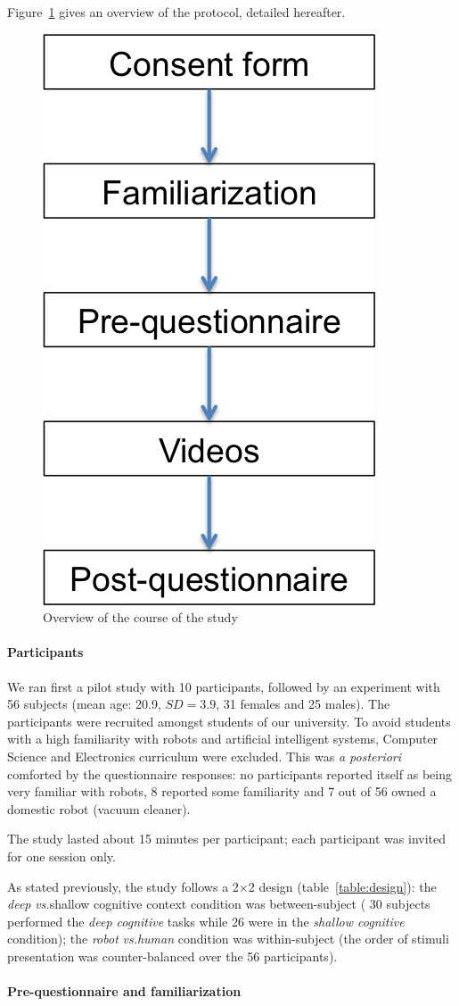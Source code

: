 \documentclass[lettersize, noapacite, twoside, HRI]{apa_HRI}
\newcommand{\vs}{\textit{vs.}\xspace}
\begin{document}
Figure~\ref{course_of_study} gives an overview of the protocol, detailed
hereafter.

\begin{figure}[ht!]
    \centering
    \includegraphics[width=0.3\linewidth]{experimentFlow}
    \caption{Overview of the course of the study}
    \label{course_of_study}
\end{figure}
\paragraph{Participants}

We ran first a pilot study with 10 participants, followed by an experiment with
56 subjects (mean age: 20.9, $SD=3.9$, 31 females and 25 males).
The participants were recruited amongst students of our university. To avoid
students with a high familiarity with robots and artificial intelligent systems,
Computer Science and Electronics curriculum were excluded. This was \textit{a
posteriori} comforted by the questionnaire responses: no participants
reported itself as being very familiar with robots, 8 reported some familiarity
and 7 out of 56 owned a domestic robot (vacuum cleaner).

The study lasted about 15 minutes per participant; each participant was invited
for one session only.

As stated previously, the study follows a 2$\times$2 design
(table~\ref{table:design}): the \emph{deep} \vs {shallow cognitive context}
condition was between-subject ( 30 subjects performed the \emph{deep cognitive}
tasks while 26 were in the \emph{shallow cognitive} condition); the \emph{robot}
\vs \emph{human} condition was within-subject (the order of stimuli presentation
was counter-balanced over the 56 participants).

\paragraph{Pre-questionnaire and familiarization}
\end{document}
